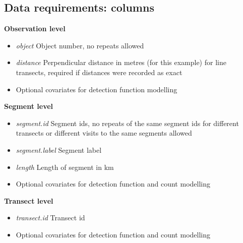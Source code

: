 \subsection{Data requirements: columns}
\textbf{Observation level}\\
\begin{itemize}
\item{\textit{object} Object number, no repeats allowed} \\
\item{\textit{distance} Perpendicular distance in metres (for this example) for line transects, required if distances were recorded as exact}\\
\item{Optional covariates for detection function modelling}\\
\end{itemize}

\noindent \textbf{Segment level}\\
\begin{itemize}
\item{\textit{segment.id} Segment ids, no repeats of the same segment ids for different transects or different visits to the same segments allowed}\\
\item{\textit{segment.label} Segment label} \\
\item{\textit{length} Length of segment in km}\\
\item{Optional covariates for detection function and count modelling}\\
\end{itemize}

\noindent \textbf{Transect level}\\
\begin{itemize}
\item{\textit{transect.id} Transect id}\\
\item{Optional covariates for detection function and count modelling}\\
\end{itemize}


